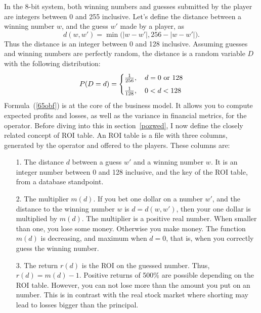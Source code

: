 \documentclass[oneside,10pt]{book}
\begin{document}
In the 8-bit system, both winning numbers and guesses submitted by the player are integers between 0 and 255 inclusive. Let's define the distance between a winning number $w$, and the guess $w'$ made by a player, as
\begin{equation}
d(w, w') = \min\Big(|w - w'|, 256 - |w - w'|\Big).\label{uyr4bg}
\end{equation}
Thus the distance is an integer between 0 and 128 inclusive. Assuming guesses and winning numbers are perfectly random, the distance is a random variable $D$ with the following distribution:
\begin{eqnarray}\label{65obf}
  P(D = d) =
    \begin{cases}
      \frac{1}{256}, & \, d=0 \text{ or } 128 \vspace{1ex}\\
      \frac{1}{128}, & \, 0<d<128  
    \end{cases}       
\end{eqnarray}
Formula~(\ref{65obf}) is at the core of the business model. It allows you to compute expected profits and losses, as well as the variance in financial metrics, for the operator. 
 Before diving into this in section~\ref{pozwed}, I now define the closely related concept of ROI table. 
An ROI table is a file with three columns, generated by the operator and offered to the players. These columns are: \vspace{1ex}
\begin{itemize}
\item[1.] The distance $d$ between a guess $w'$ and a winning number $w$. It is an integer number between 0 and 128 inclusive, and the key of the ROI table, from a database standpoint.
\item[2.] The multiplier $m(d)$. If you bet one dollar on a number $w'$, and the distance to the  winning number $w$ 
  is  $d = d(w, w')$, then your one dollar is multiplied by $m(d)$. The multiplier is a positive real number. When smaller than one,
 you  lose some money. Otherwise you make money. The function $m(d)$ is decreasing, and maximum when $d=0$, that is, when you correctly guess the winning number.
\item[3.] The return $r(d)$ is the ROI on the guessed number. Thus, $r(d)=m(d)-1$. Positive returns of 500\% are possible
 depending on the ROI table. However, you can not lose more than the amount you put on an number. This is in contrast with the real stock market where shorting may lead to losses bigger than the principal.
\end{itemize} \vspace{1ex}
\end{document}
